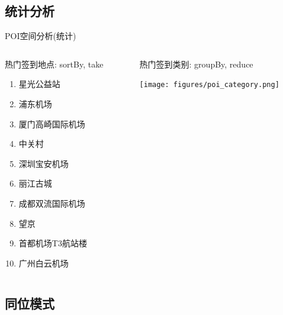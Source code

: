 \subsection{统计分析}

\begin{frame}[c]{POI空间分析(统计)}
    \begin{columns}
        \vspace{0.5em}
        \begin{column}{0.5 \textwidth}
            \alert{热门签到地点}: sortBy, take

            \pause
            \begin{enumerate}
                \item 星光公益站
                \item 浦东机场
                \item 厦门高崎国际机场
                \item 中关村
                \item 深圳宝安机场
                \item 丽江古城
                \item 成都双流国际机场
                \item 望京
                \item 首都机场T3航站楼
                \item 广州白云机场
            \end{enumerate}
        \end{column}

        \pause
        \vspace{0.5em}
        \begin{column}{0.5 \textwidth}
            \alert{热门签到类别}: groupBy, reduce

            \pause
            \vspace{2em}
            \texttt{[image: figures/poi\_category.png]}
        \end{column}
    \end{columns}
\end{frame}



\subsection{同位模式}

